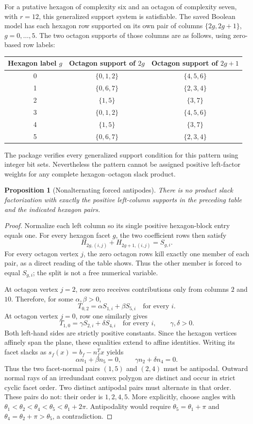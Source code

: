 \documentclass[11pt,a4paper]{article}
\newtheorem{proposition}[theorem]{Proposition}
\theoremstyle{definition}\newtheorem{definition}[theorem]{Definition}
\theoremstyle{remark}\newtheorem{remark}[theorem]{Remark}
\begin{document}
For a putative hexagon of complexity six and an octagon of complexity seven,
with $r=12$, this generalized support system is satisfiable. The saved Boolean
model has each hexagon row supported on its own pair of columns
$\{2g,2g+1\}$, $g=0,\ldots,5$. The two octagon supports of those columns are
as follows, using zero-based row labels:
\begin{center}
\begin{tabular}{@{}ccc@{}}\toprule
Hexagon label $g$&Octagon support of $2g$&Octagon support of $2g+1$\\\midrule
0&$\{0,1,2\}$&$\{4,5,6\}$\\
1&$\{0,6,7\}$&$\{2,3,4\}$\\
2&$\{1,5\}$&$\{3,7\}$\\
3&$\{0,1,2\}$&$\{4,5,6\}$\\
4&$\{1,5\}$&$\{3,7\}$\\
5&$\{0,6,7\}$&$\{2,3,4\}$\\\bottomrule
\end{tabular}
\end{center}
The package verifies every generalized support condition for this pattern
using integer bit sets. Nevertheless the pattern cannot be assigned positive
left-factor weights for any complete hexagon--octagon slack product.

\begin{proposition}[Nonalternating forced antipodes]\label{prop:barrier}
There is no product slack factorization with exactly the positive left-column
supports in the preceding table and the indicated hexagon pairs.
\end{proposition}
\begin{proof}
Normalize each left column so its single positive hexagon-block entry equals
one. For every hexagon facet $g$, the two coefficient rows then satisfy
\[
 H_{2g,(i,j)}+H_{2g+1,(i,j)}=S_{g,i}.
\]
For every octagon vertex $j$, the zero octagon rows kill exactly one member
of each pair, as a direct reading of the table shows. Thus the other member
is forced to equal $S_{g,i}$; the split is not a free numerical variable.

At octagon vertex $j=2$, row zero receives contributions only from columns
$2$ and $10$. Therefore, for some $\alpha,\beta>0$,
\[
 T_{0,2}=\alpha S_{1,i}+\beta S_{5,i}\quad\text{for every }i.
\]
At octagon vertex $j=0$, row one similarly gives
\[
 T_{1,0}=\gamma S_{2,i}+\delta S_{4,i}\quad\text{for every }i,
 \qquad\gamma,\delta>0.
\]
Both left-hand sides are strictly positive constants. Since the hexagon
vertices affinely span the plane, these equalities extend to affine identities.
Writing its facet slacks as $s_f(x)=b_f-n_f^Tx$ yields
\[
 \alpha n_1+\beta n_5=0,\qquad
 \gamma n_2+\delta n_4=0.
\]
Thus the two facet-normal pairs $(1,5)$ and $(2,4)$ must be antipodal.
Outward normal rays of an irredundant convex polygon are distinct and occur
in strict cyclic facet order. Two distinct antipodal pairs must alternate
in that order. These pairs do not: their order is $1,2,4,5$. More explicitly,
choose angles with $\theta_1<\theta_2<\theta_4<\theta_5<\theta_1+2\pi$.
Antipodality would require $\theta_5=\theta_1+\pi$ and
$\theta_4=\theta_2+\pi>\theta_5$, a contradiction.
\end{proof}
\end{document}
